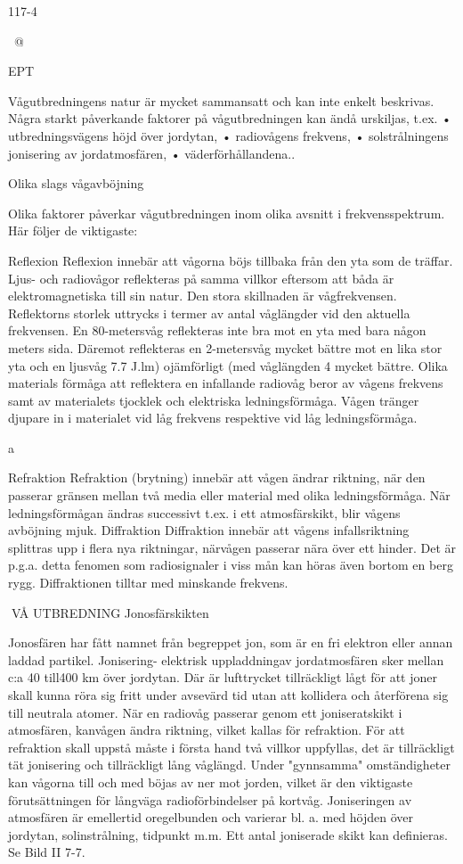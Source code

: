 117-4

~@~

EPT

Vågutbredningens natur är mycket sammansatt och kan inte enkelt beskrivas. Några starkt påverkande faktorer på vågutbredningen kan ändå urskiljas, t.ex.
• utbredningsvägens höjd över jordytan,
• radiovågens frekvens,
• solstrålningens jonisering av jordatmosfären,
• väderförhållandena..

Olika slags vågavböjning

Olika faktorer påverkar vågutbredningen
inom olika avsnitt i frekvensspektrum. Här
följer de viktigaste:

Reflexion
Reflexion innebär att vågorna böjs tillbaka
från den yta som de träffar. Ljus- och radiovågor reflekteras på samma villkor eftersom
att båda är elektromagnetiska till sin natur.
Den stora skillnaden är vågfrekvensen.
Reflektorns storlek uttrycks i termer av
antal våglängder vid den aktuella frekvensen. En 80-metersvåg reflekteras inte bra
mot en yta med bara någon meters sida.
Däremot reflekteras en 2-metersvåg mycket bättre mot en lika stor yta och en ljusvåg
7.7 J.lm) ojämförligt
(med våglängden 4
mycket bättre.
Olika materials förmåga att reflektera en
infallande radiovåg beror av vågens frekvens samt av materialets tjocklek och elektriska ledningsförmåga. Vågen tränger djupare in i materialet vid låg frekvens respektive vid låg ledningsförmåga.

a

Refraktion
Refraktion (brytning) innebär att vågen ändrar riktning, när den passerar gränsen mellan två media eller material med olika ledningsförmåga. När ledningsförmågan ändras successivt t.ex. i ett atmosfärskikt, blir
vågens avböjning mjuk.
Diffraktion
Diffraktion innebär att vågens infallsriktning
splittras upp i flera nya riktningar, närvågen
passerar nära över ett hinder. Det är p.g.a.
detta fenomen som radiosignaler i viss mån
kan höras även bortom en berg rygg. Diffraktionen tilltar med minskande frekvens.

VÅ UTBREDNING
Jonosfärskikten

Jonosfären har fått namnet från begreppet
jon, som är en fri elektron eller annan laddad
partikel. Jonisering- elektrisk uppladdningav jordatmosfären sker mellan c:a 40 till400
km över jordytan. Där är lufttrycket tillräckligt
lågt för att joner skall kunna röra sig fritt
under avsevärd tid utan att kollidera och
återförena sig till neutrala atomer.
När en radiovåg passerar genom ett
joniseratskikt i atmosfären, kanvågen ändra
riktning, vilket kallas för refraktion. För att
refraktion skall uppstå måste i första hand
två villkor uppfyllas, det är tillräckligt tät jonisering och tillräckligt lång våglängd. Under
"gynnsamma" omständigheter kan vågorna
till och med böjas av ner mot jorden, vilket är
den viktigaste förutsättningen för långväga
radioförbindelser på kortvåg.
Joniseringen av atmosfären är emellertid
oregelbunden och varierar bl. a. med höjden
över jordytan, solinstrålning, tidpunkt m.m.
Ett antal joniserade skikt kan definieras.
Se Bild II 7-7.

